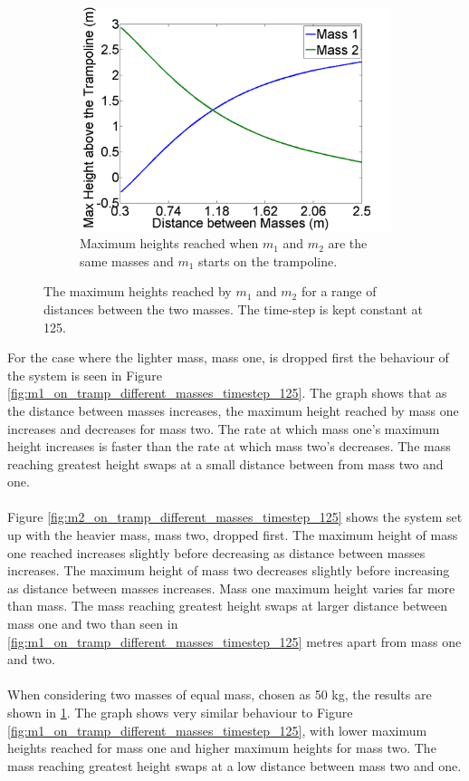 \begin{figure}[H]
    \begin{subfigure}[t]{0.3\textwidth}
		\includegraphics[width=\textwidth]{m1_on_tramp_same_masses_timestep_125.png}
    	\caption{Maximum heights reached when $m_1$ and $m_2$ are the same masses and $m_1$ starts on the trampoline.}\label{fig:m1_on_tramp_same_masses_timestep_125}
    \end{subfigure}\hfill
    \caption{The maximum heights reached by $m_1$ and $m_2$ for a range of distances between the two masses. The time-step is kept constant at 125.}\label{fig:timestep_125}
\end{figure}

\noindent For the case where the lighter mass, mass one, is dropped first the behaviour of the system is seen in Figure \ref{fig:m1_on_tramp_different_masses_timestep_125}. The graph shows that as the distance between masses increases, the maximum height reached by mass one increases and decreases for mass two. The rate at which mass one's maximum height increases is faster than the rate at which mass two's decreases. The mass reaching greatest height swaps at a small distance between from mass two and one. %
\\
\\
\noindent Figure \ref{fig:m2_on_tramp_different_masses_timestep_125} shows the system set up with the heavier mass, mass two, dropped first. The maximum height of mass one reached increases slightly before decreasing as distance between masses increases. The maximum height of mass two decreases slightly before increasing as distance between masses increases. Mass one maximum height varies far more than mass. The mass reaching greatest height swaps at larger distance between mass one and two than seen in \ref{fig:m1_on_tramp_different_masses_timestep_125} metres apart from mass one and two.  \\
\\
\noindent When considering two masses of equal mass, chosen as 50 kg, the results are shown in \ref{fig:m1_on_tramp_same_masses_timestep_125}. The graph shows very similar behaviour to Figure \ref{fig:m1_on_tramp_different_masses_timestep_125}, with lower maximum heights reached for mass one and higher maximum heights for mass two. The mass reaching greatest height swaps at a low distance between mass two and one. 

